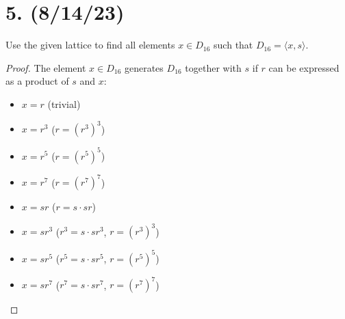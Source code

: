 \documentclass{article}
\begin{document}
\section*{5. (8/14/23)}

Use the given lattice to find all elements $x \in D_{16}$ such that $D_{16} = \langle x, s \rangle$.

\begin{proof}
    The element $x \in D_{16}$ generates $D_{16}$ together with $s$ if $r$ can be expressed as a product of $s$ and $x$:
    \begin{itemize}[itemsep=0em]
        \item $x = r$ (trivial)
        \item $x = r^3$ ($r = (r^3)^3$)
        \item $x = r^5$ ($r = (r^5)^5$)
        \item $x = r^7$ ($r = (r^7)^7$)
        \item $x = sr$ ($r = s \cdot sr$)
        \item $x = sr^3$ ($r^3 = s \cdot sr^3$, $r = (r^3)^3$)
        \item $x = sr^5$ ($r^5 = s \cdot sr^5$, $r = (r^5)^5$)
        \item $x = sr^7$ ($r^7 = s \cdot sr^7$, $r = (r^7)^7$)
    \end{itemize}
\end{proof}
\end{document}
